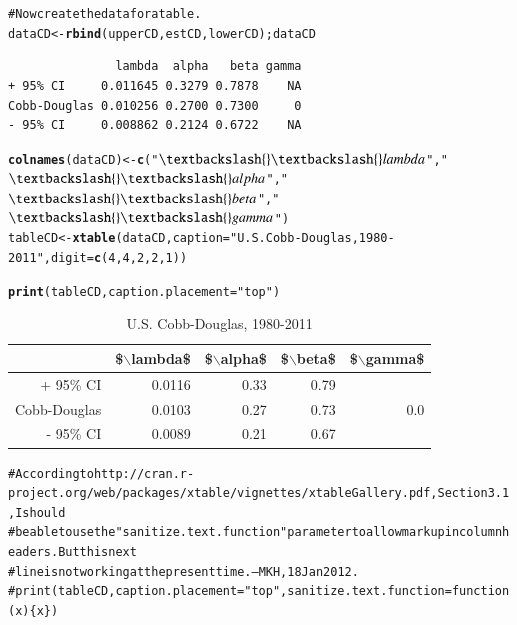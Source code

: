 \documentclass[preprint,authoryear,12pt]{elsarticle}\usepackage{graphicx, color}
\makeatletter
\newcommand{\hlfunctioncall}[1]{\textcolor[rgb]{0.501960784313725,0,0.329411764705882}{\textbf{#1}}}%
\newcommand{\hlstring}[1]{\textcolor[rgb]{0.6,0.6,1}{#1}}%
\newcommand{\hlcomment}[1]{\textcolor[rgb]{0.180392156862745,0.6,0.341176470588235}{#1}}%
\newenvironment{kframe}{%
 \def\at@end@of@kframe{}%
 \ifinner\ifhmode%
  \def\at@end@of@kframe{\end{minipage}}%
  \begin{minipage}{\columnwidth}%
 \fi\fi%
 \def\FrameCommand##1{\hskip\@totalleftmargin \hskip-\fboxsep
 \colorbox{shadecolor}{##1}\hskip-\fboxsep
     \hskip-\linewidth \hskip-\@totalleftmargin \hskip\columnwidth}%
 \MakeFramed {\advance\hsize-\width
   \@totalleftmargin\z@ \linewidth\hsize
   \@setminipage}}%
 {\par\unskip\endMakeFramed%
 \at@end@of@kframe}
\newenvironment{knitrout}{}{} %
\makeatother
\begin{document}
\begin{knitrout}
\begin{kframe}
\begin{alltt}
\hlcomment{# Now create the data for a table.}
dataCD <- \hlfunctioncall{rbind}(upperCD, estCD, lowerCD); dataCD
\end{alltt}
\begin{verbatim}
               lambda  alpha   beta gamma
+ 95% CI     0.011645 0.3279 0.7878    NA
Cobb-Douglas 0.010256 0.2700 0.7300     0
- 95% CI     0.008862 0.2124 0.6722    NA
\end{verbatim}
\begin{alltt}
\hlfunctioncall{colnames}(dataCD) <- \hlfunctioncall{c}(\hlstring{"$\textbackslash{}\textbackslash{}lambda$"}, \hlstring{"$\textbackslash{}\textbackslash{}alpha$"}, \hlstring{"$\textbackslash{}\textbackslash{}beta$"}, \hlstring{"$\textbackslash{}\textbackslash{}gamma$"})
tableCD <- \hlfunctioncall{xtable}(dataCD, caption=\hlstring{"U.S. Cobb-Douglas, 1980-2011"}, digit = \hlfunctioncall{c}(4, 4, 2, 2, 1))
\end{alltt}
\end{kframe}
\end{knitrout}


\begin{kframe}
\begin{alltt}
\hlfunctioncall{print}(tableCD, caption.placement=\hlstring{"top"})
\end{alltt}
\end{kframe}%
\begin{table}[ht]
\begin{center}
\caption{U.S. Cobb-Douglas, 1980-2011}
\begin{tabular}{rrrrr}
  \hline
 & \$$\backslash$lambda\$ & \$$\backslash$alpha\$ & \$$\backslash$beta\$ & \$$\backslash$gamma\$ \\ 
  \hline
+ 95\% CI & 0.0116 & 0.33 & 0.79 &  \\ 
  Cobb-Douglas & 0.0103 & 0.27 & 0.73 & 0.0 \\ 
  - 95\% CI & 0.0089 & 0.21 & 0.67 &  \\ 
   \hline
\end{tabular}
\end{center}
\end{table}
\begin{kframe}\begin{alltt}
\hlcomment{# According to http://cran.r-project.org/web/packages/xtable/vignettes/xtableGallery.pdf, Section 3.1, I should }
\hlcomment{# be able to use the "sanitize.text.function" parameter to allow markup in column headers. But this next}
\hlcomment{# line is not working at the present time. --MKH, 18 Jan 2012.}
\hlcomment{# print(tableCD, caption.placement="top", sanitize.text.function = function(x)\{x\})}
\end{alltt}
\end{kframe}
\end{document}
